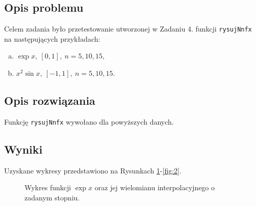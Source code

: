 \documentclass{classrep}
\begin{document}
	\subsection{Opis problemu}
		Celem zadania było przetestowanie utworzonej w Zadaniu 4. funkcji \texttt{rysujNnfx} na następujących przykładach:
			\begin{enumerate}[(a)]
				\item $\exp{x},~ [0,1],~ n = 5, 10, 15$,
				\item $x^2 \sin{x},~ [-1,1],~ n = 5, 10, 15$.
			\end{enumerate}
	\subsection{Opis rozwiązania}	
		Funkcję \texttt{rysujNnfx} wywołano dla powyższych danych.
		
	\subsection{Wyniki}
		Uzyskane wykresy przedstawiono na Rysunkach \ref{fig:1}-\ref{fig:2}.
			
		\begin{figure}[!h]
			\centering
			 \hfill
			 \hfill
  			\caption{Wykres funkcji $\exp{x}$ oraz jej wielomianu interpolacyjnego o zadanym stopniu.}
  			\label{fig:1}
		\end{figure}		
		
\end{document}
